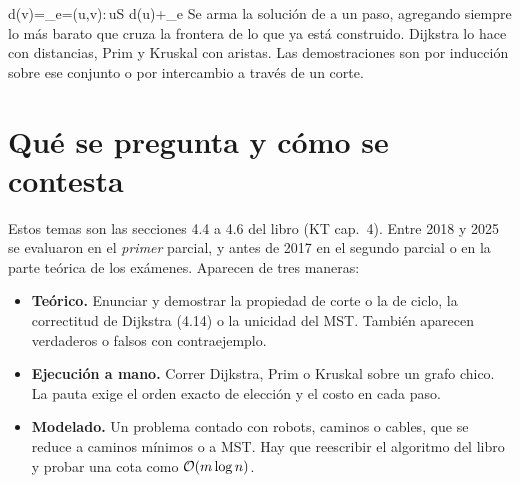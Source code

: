 
\newcommand{\grpred}{\mathrm{pred}}
\newcommand{\grop}[1]{\textsc{#1}}

  {d(v)\;=\;\min_{e=(u,v):\,u\in S}\; d(u)+\ell_e}
  {Se arma la solución de a un paso, agregando siempre lo más barato que cruza la frontera de lo que ya está construido. Dijkstra lo hace con distancias, Prim y Kruskal con aristas. Las demostraciones son por inducción sobre ese conjunto o por intercambio a través de un corte.}

\section{Qué se pregunta y cómo se contesta}

Estos temas son las secciones 4.4 a 4.6 del libro (KT cap.~4). Entre 2018 y 2025 se evaluaron en el \emph{primer} parcial, y antes de 2017 en el segundo parcial o en la parte teórica de los exámenes. Aparecen de tres maneras:
\begin{itemize}
  \item \textbf{Teórico.} Enunciar y demostrar la propiedad de corte o la de ciclo, la correctitud de Dijkstra (4.14) o la unicidad del MST. También aparecen verdaderos o falsos con contraejemplo.
  \item \textbf{Ejecución a mano.} Correr Dijkstra, Prim o Kruskal sobre un grafo chico. La pauta exige el orden exacto de elección y el costo en cada paso.
  \item \textbf{Modelado.} Un problema contado con robots, caminos o cables, que se reduce a caminos mínimos o a MST. Hay que reescribir el algoritmo del libro y probar una cota como $\mathcal{O}(m\log n)$.
\end{itemize}

